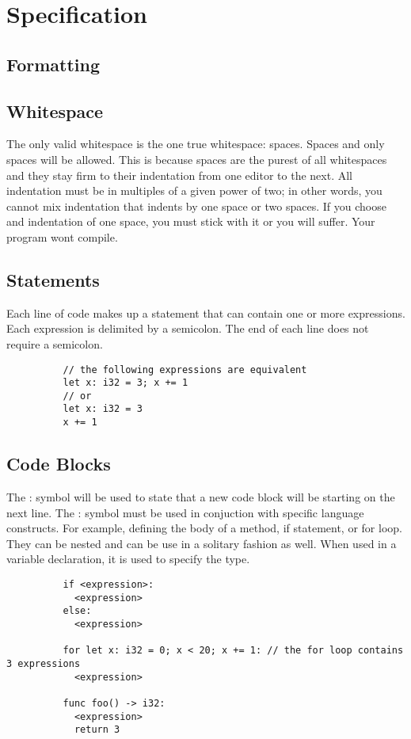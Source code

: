 \documentclass{article}
\newcommand{\centersec}[1]{\section*{\hfil #1 \hfil}}
\newcommand{\subcentersec}[1]{\subsection*{\hfil #1 \hfil}}
\begin{document}
  \centersec{Specification}
    \subcentersec{Formatting}
      \subcentersec{Whitespace}
        The only valid whitespace is the one true whitespace: spaces. Spaces and only spaces will be allowed.
        This is because spaces are the purest of all whitespaces and they stay firm to their indentation
        from one editor to the next. All indentation must be in multiples of a given power of two; in other words,
        you cannot mix indentation that indents by one space or two spaces. If you choose and indentation of
        one space, you must stick with it or you will suffer. Your program wont compile.

      \subcentersec{Statements}
        Each line of code makes up a statement that can contain one or more expressions. Each
        expression is delimited by a semicolon. The end of each line does not require a semicolon.
        \begin{verbatim}
          // the following expressions are equivalent
          let x: i32 = 3; x += 1
          // or
          let x: i32 = 3
          x += 1
        \end{verbatim}

      \subcentersec{Code Blocks}
        The : symbol will be used to state that a new code block will be starting on the next line. The
        : symbol must be used in conjuction with specific language constructs. For example, defining the
        body of a method, if statement, or for loop. They can be nested and can be use in a solitary
        fashion as well. When used in a variable declaration, it is used to specify the type.
        \begin{verbatim}
          if <expression>:
            <expression>
          else:
            <expression>

          for let x: i32 = 0; x < 20; x += 1: // the for loop contains 3 expressions
            <expression>

          func foo() -> i32:
            <expression>
            return 3
        \end{verbatim}
\end{document}
